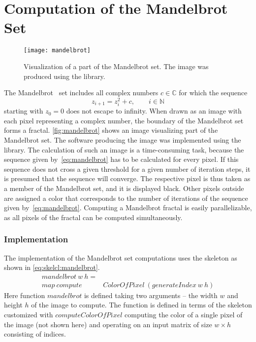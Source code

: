 \section{Computation of the Mandelbrot Set}

\begin{figure}[tb]
  \centering
  \texttt{[image: mandelbrot]}
  \caption{Visualization of a part of the Mandelbrot set. The image was produced using the \SkelCL library.}
  \label{fig:mandelbrot}
\end{figure}

The Mandelbrot~\cite{Mandelbrot1980} set includes all complex numbers $c \in {\mathbb C}$ for which the sequence
\begin{equation}
	z_{i+1} = z_{i}^{2} + c,\qquad i\in {\mathbb N}
	\label{eq:mandelbrot}
\end{equation}
starting with $z_{0}=0$ does not escape to infinity.
When drawn as an image with each pixel representing a complex number, the boundary of the Mandelbrot set forms a fractal.
\autoref{fig:mandelbrot} shows an image visualizing part of the Mandelbrot set.
The software producing the image was implemented using the \SkelCL library. 
The calculation of such an image is a time-consuming task, because the sequence given by~\autoref{eq:mandelbrot} has to be calculated for every pixel.
If this sequence does not cross a given threshold for a given number of iteration steps, it is presumed that the sequence will converge.
The respective pixel is thus taken as a member of the Mandelbrot set, and it is displayed black.
Other pixels outside are assigned a color that corresponds to the number of iterations of the sequence given by~\autoref{eq:mandelbrot}.
Computing a Mandelbrot fractal is easily parallelizable, as all pixels of the fractal can be computed simultaneously.

\subsubsection*{\SkelCL Implementation}
\label{sec:mandelbrot:implementation}
The \SkelCL implementation of the Mandelbrot set computations uses the \map skeleton as shown in \autoref{eq:skelcl:mandelbrot}.
\begin{align}
  mandelbrot\ w\ h =&  \nonumber\\
         map\ compute&ColorOfPixel\ (generateIndex\ w\ h)
  \label{eq:skelcl:mandelbrot}
\end{align}
Here function $mandelbrot$ is defined taking two arguments -- the width $w$ and height $h$ of the image to compute.
The function is defined in terms of the \map skeleton customized with $computeColorOfPixel$ computing the color of a single pixel of the image (not shown here) and operating on an input matrix of size $w\times h$ consisting of indices.

